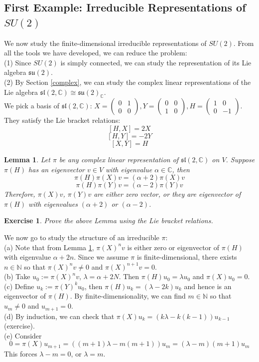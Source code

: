 \documentclass[11pt]{article}
\newtheorem{lemma}[theorem]{Lemma}
\newtheorem{exercise}[theorem]{Exercise}
\newcommand{\bb}[1]{\mathbb{#1}}
\newcommand{\mf}[1]{\mathfrak{#1}}
\begin{document}
\subsection{First Example: Irreducible Representations of $SU(2)$}
We now study the finite-dimensional irreducible representations of $SU(2)$. From all the tools we have developed, we can reduce the problem:\\
(1) Since $SU(2)$ is simply connected, we can study the representation of its Lie algebra $\mf{su}(2)$.\\
(2) By Section \ref{complex}, we can study the complex linear representations of the Lie algebra $\mf{sl}(2,\bb{C}) \cong \mf{su}(2)_{\bb{C}}$.\\
We pick a basis of $\mf{sl}(2,\bb{C})$: $X = \left( \begin{array}{cc}
0 & 1 \\
0 & 0 \end{array} \right), Y = \left( \begin{array}{cc}
0 & 0 \\
1 & 0 \end{array} \right), H = \left( \begin{array}{cc}
1 & 0 \\
0 & -1 \end{array} \right)$. They satisfy the Lie bracket relations:
$$[H,X] = 2X$$
$$[H,Y] = -2Y$$
$$[X,Y] = H$$
\begin{lemma} \label{sl2triple}
Let $\pi$ be any complex linear representation of $\mf{sl}(2,\bb{C})$ on $V$. Suppose $\pi(H)$ has an eigenvector $v \in V$ with eigenvalue $\alpha \in \bb{C}$, then
$$\pi(H)\pi(X)v = (\alpha+2)\pi(X)v$$
$$\pi(H)\pi(Y)v = (\alpha-2)\pi(Y)v$$
Therefore, $\pi(X)v$, $\pi(Y)v$ are either zero vector, or they are eigenvector of $\pi(H)$ with eigenvalues $(\alpha+2)$ or $(\alpha-2)$.
\end{lemma}
\begin{exercise}
Prove the above Lemma using the Lie bracket relations.
\end{exercise}
We now go to study the structure of an irreducible $\pi$:\\
(a) Note that from Lemma \ref{sl2triple}, $\pi(X)^nv$ is either zero or eigenvector of $\pi(H)$ with eigenvalue $\alpha + 2n$. Since we assume $\pi$ is finite-dimensional, there exists $n \in \bb{N}$ so that $\pi(X)^nv \neq 0$ and $\pi(X)^{n+1}v = 0$.\\
(b) Take $u_0 := \pi(X)^nv$, $\lambda = \alpha + 2N$. Then $\pi(H)u_0 = \lambda u_0$ and $\pi(X)u_0 = 0$.\\
(c) Define $u_k := \pi(Y)^ku_0$, then $\pi(H)u_k = (\lambda - 2k)u_k$ and hence is an eigenvector of $\pi(H)$. By finite-dimensionality, we can find $m \in \bb{N}$ so that $u_m \neq 0$ and $u_{m+1} = 0$.\\
(d) By induction, we can check that $\pi(X)u_k = (k\lambda - k(k-1))u_{k-1}$ (exercise).\\
(e) Consider
$$0 = \pi(X)u_{m+1} = ((m+1)\lambda - m(m+1))u_m  = (\lambda - m)(m+1) u_m$$
This forces $\lambda - m = 0$, or $\lambda = m$.\\
\end{document}
